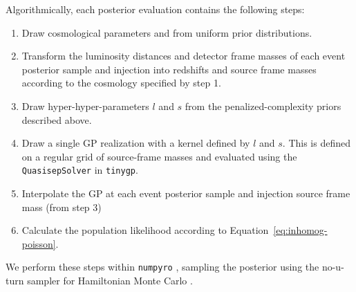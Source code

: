 \documentclass[preprint2,linenumbers]{aastex631}
\begin{document}
Algorithmically, each posterior evaluation contains the following steps: 
\begin{enumerate}
    \item Draw cosmological parameters \Ho{} and \Omm{} from uniform prior distributions.
    \item Transform the luminosity distances and detector frame masses of each event posterior sample and injection into redshifts and source frame masses according to the cosmology specified by step 1.
    \item Draw hyper-hyper-parameters $l$ and $s$ from the penalized-complexity priors described above.
    \item Draw a single \ac{GP} realization with a kernel defined by $l$ and $s$.
    This is defined on a regular grid of source-frame masses and evaluated using the \texttt{QuasisepSolver} in \texttt{tinygp}.
    \item Interpolate the \ac{GP} at each event posterior sample and injection source frame mass (from step 3)
    \item Calculate the population likelihood according to Equation~\ref{eq:inhomog-poisson}.
\end{enumerate}
We perform these steps within \texttt{numpyro} \citep{bingham_pyro_2019,phan_composable_2019}, sampling the posterior using the no-u-turn sampler for Hamiltonian Monte Carlo \citep{hoffman_no-u-turn_2011}. 
\end{document}
